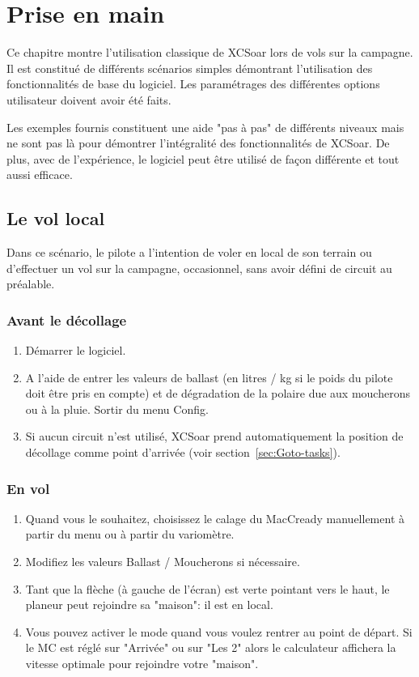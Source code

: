 \chapter{Prise en main}\label{cha:quickstart}

Ce chapitre montre l'utilisation classique de XCSoar lors de vols sur la campagne. Il est constitué de différents scénarios simples démontrant l'utilisation des fonctionnalités de base du logiciel. Les paramétrages des différentes options utilisateur doivent avoir été faits.

Les exemples fournis constituent une aide "pas à pas" de différents niveaux mais ne sont pas là pour démontrer  l'intégralité des fonctionnalités de XCSoar. De plus, avec de l'expérience, le logiciel peut être utilisé de façon différente et tout aussi efficace.

\section{Le vol local}\label{sec:local-flight}

Dans ce scénario, le pilote a l'intention de voler en local de son terrain ou d'effectuer un vol sur la campagne, occasionnel, sans avoir défini de circuit au préalable.

\subsection*{Avant le décollage}
\begin{enumerate}
\item  Démarrer le logiciel.
\item  A l'aide de \blink{} entrer les valeurs de ballast (en litres / kg si le poids du pilote doit être pris en compte) et de dégradation de la polaire due aux moucherons ou à la pluie. Sortir du menu Config.
\item  Si aucun circuit n'est utilisé, XCSoar prend automatiquement la position de décollage comme point d'arrivée (voir section~\ref{sec:Goto-tasks}).
\end{enumerate}

\subsection*{En vol}
\begin{enumerate}
\item  Quand vous le souhaitez, choisissez le calage du MacCready manuellement à partir du menu
\blink{} ou à partir du variomètre.
\item  Modifiez les valeurs Ballast / Moucherons si nécessaire.
\item  Tant que la flèche (à gauche de l'écran) est verte pointant vers le haut, le planeur peut rejoindre sa "maison": il est en local.
\item  Vous pouvez activer le mode  quand vous voulez rentrer au point de départ. Si le MC est réglé sur "Arrivée" ou sur "Les 2" alors le calculateur affichera la vitesse optimale pour rejoindre votre "maison".
\end{enumerate}

